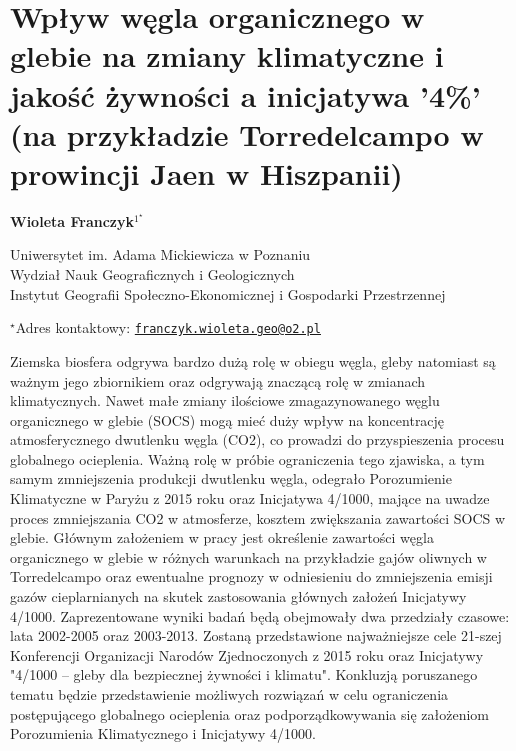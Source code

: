 \documentclass[\main/boa.tex]{subfiles}
\begin{document}
\section{Wpływ węgla organicznego w glebie na zmiany klimatyczne i jakość żywności a inicjatywa '4\%' (na przykładzie Torredelcampo w prowincji Jaen w Hiszpanii)}

\begin{center}
  {\bf {} Wioleta Franczyk$^{1^\star}$}
\end{center}

\vskip 0.3cm

\begin{affiliations}
\begin{enumerate}
\begin{minipage}{0.915\textwidth}
\centering
\item Uniwersytet im. Adama Mickiewicza w Poznaniu\\ Wydział Nauk Geograficznych i Geologicznych\\ Instytut Geografii Społeczno-Ekonomicznej i Gospodarki Przestrzennej \\[-2pt]
\end{minipage}
\end{enumerate}
$^\star$Adres kontaktowy: \href{mailto:franczyk.wioleta.geo@o2.pl}{\nolinkurl{franczyk.wioleta.geo@o2.pl}}\\
\end{affiliations}

\vskip 0.5cm


\vskip 0.5cm

Ziemska biosfera odgrywa bardzo dużą rolę w obiegu węgla, gleby natomiast są ważnym jego zbiornikiem oraz odgrywają znaczącą rolę w zmianach klimatycznych. Nawet małe zmiany ilościowe zmagazynowanego węglu organicznego w glebie (SOCS) mogą mieć duży wpływ na koncentrację atmosferycznego dwutlenku węgla (CO2), co prowadzi do przyspieszenia procesu globalnego ocieplenia. Ważną rolę w próbie ograniczenia tego zjawiska, a tym samym zmniejszenia produkcji dwutlenku węgla, odegrało Porozumienie Klimatyczne w Paryżu z 2015 roku oraz Inicjatywa 4/1000, mające na uwadze proces zmniejszania CO2 w atmosferze, kosztem zwiększania zawartości SOCS w glebie. Głównym założeniem w pracy jest określenie zawartości węgla organicznego w glebie w różnych warunkach na przykładzie gajów oliwnych w Torredelcampo oraz ewentualne prognozy w odniesieniu do zmniejszenia emisji gazów cieplarnianych na skutek zastosowania głównych założeń Inicjatywy 4/1000. Zaprezentowane wyniki badań będą obejmowały dwa przedziały czasowe: lata 2002-2005 oraz 2003-2013. Zostaną przedstawione najważniejsze cele 21-szej Konferencji Organizacji Narodów Zjednoczonych z 2015 roku oraz Inicjatywy "4/1000 – gleby dla bezpiecznej żywności i klimatu". Konkluzją poruszanego tematu będzie przedstawienie możliwych rozwiązań w celu ograniczenia postępującego globalnego ocieplenia oraz podporządkowywania się założeniom Porozumienia Klimatycznego i Inicjatywy 4/1000.
\end{document}
